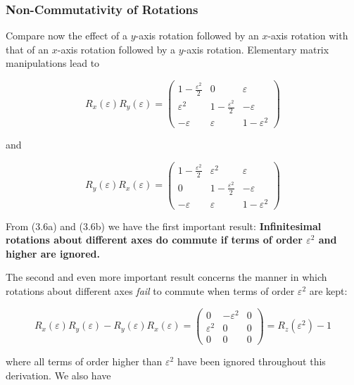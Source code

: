 \documentclass[11pt,a4paper]{article}
\begin{document}
\subsubsection{Non-Commutativity of Rotations}

Compare now the effect of a $y$-axis rotation followed by an $x$-axis rotation with that of an $x$-axis rotation followed by a $y$-axis rotation. Elementary matrix manipulations lead to

\begin{equation}
R_x(\varepsilon)R_y(\varepsilon) = \begin{pmatrix} 1 - \frac{\varepsilon^2}{2} & 0 & \varepsilon \\ \varepsilon^2 & 1 - \frac{\varepsilon^2}{2} & -\varepsilon \\ -\varepsilon & \varepsilon & 1 - \varepsilon^2 \end{pmatrix}
\tag{3.6a}
\end{equation}

and

\begin{equation}
R_y(\varepsilon)R_x(\varepsilon) = \begin{pmatrix} 1 - \frac{\varepsilon^2}{2} & \varepsilon^2 & \varepsilon \\ 0 & 1 - \frac{\varepsilon^2}{2} & -\varepsilon \\ -\varepsilon & \varepsilon & 1 - \varepsilon^2 \end{pmatrix}
\tag{3.6b}
\end{equation}

From (3.6a) and (3.6b) we have the first important result: \textbf{Infinitesimal rotations about different axes do commute if terms of order $\varepsilon^2$ and higher are ignored.}

The second and even more important result concerns the manner in which rotations about different axes \textit{fail} to commute when terms of order $\varepsilon^2$ are kept:

\begin{equation}
R_x(\varepsilon)R_y(\varepsilon) - R_y(\varepsilon)R_x(\varepsilon) = \begin{pmatrix} 0 & -\varepsilon^2 & 0 \\ \varepsilon^2 & 0 & 0 \\ 0 & 0 & 0 \end{pmatrix} = R_z(\varepsilon^2) - 1
\tag{3.7}
\end{equation}

where all terms of order higher than $\varepsilon^2$ have been ignored throughout this derivation. We also have
\end{document}
